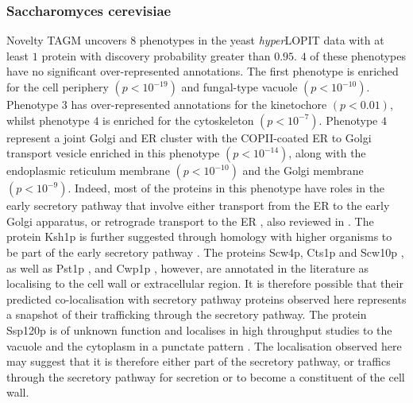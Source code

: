 \documentclass[12pt,english]{article}
\begin{document}
 \subsubsection{Saccharomyces cerevisiae}
Novelty TAGM uncovers $8$ phenotypes in the yeast \textit{hyper}LOPIT data with at least $1$ protein with discovery probability greater than $0.95$. $4$ of these phenotypes have no significant over-represented annotations. The first phenotype is enriched for the cell periphery $(p < 10^{-19})$ and fungal-type vacuole $(p < 10^{-10})$. Phenotype $3$ has over-represented annotations for the kinetochore $(p < 0.01)$, whilst phenotype $4$ is enriched for the cytoskeleton $(p < 10^{-7})$. Phenotype $4$ represent a joint Golgi and ER cluster with the COPII-coated ER to Golgi transport vesicle enriched in this phenotype $(p < 10^{-14})$, along with the endoplasmic reticulum membrane $(p < 10^{-10})$ and the Golgi membrane $(p < 10^{-9})$. Indeed, most of the proteins in this phenotype have roles in the early secretory pathway that involve either transport from the ER to the early Golgi apparatus, or retrograde transport to the ER \citep{Bue:2006,Inadome:2005, Otte:2001, Yofe:2016}, also reviewed in \citep{Delic:2013}. The protein Ksh1p is further suggested through homology with higher organisms to be part of the early secretory pathway \citep{Wendler:2010}. The proteins Scw4p, Cts1p and Scw10p \citep{Cappellaro:1998}, as well as Pst1p \citep{Pardo:2004}, and Cwp1p \citep{Yin:2005}, however, are annotated in the literature as localising to the cell wall or extracellular region. It is therefore possible that their predicted co-localisation with secretory pathway proteins observed here represents a snapshot of their trafficking through the secretory pathway. The protein Ssp120p is of unknown function and localises in high throughput studies to the vacuole \citep{Yofe:2016} and the cytoplasm in a punctate pattern \citep{Huh:2003}. The localisation observed here may suggest that it is therefore either part of the secretory pathway, or traffics through the secretory pathway for secretion or to become a constituent of the cell wall. 
 
\end{document}
